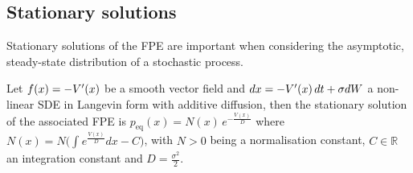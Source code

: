 \documentclass[../main.tex]{subfiles}
\begin{document}
\subsection{Stationary solutions}\label{subsec3.2}
Stationary solutions of the FPE are important when considering the asymptotic, steady-state distribution of a stochastic process.
\begin{theorem}[label=thm3.2.1]{}{}
        Let $f(x)=-V'(x)$ be a smooth vector field and $dx = -V'(x)\,dt + \sigma dW$ a non-linear SDE in Langevin form with additive diffusion, then the stationary solution of the associated FPE is $p_{\text{eq}}(x)=N(x)\,e^{-\frac{V(x)}{D}}$ where $N(x)=N\bigg(\int_{}^{}e^{\frac{V(x)}{D}}dx - C\bigg)$, with $N>0$ being a normalisation constant, $C\in \mathbb{R}$ an integration constant and $D=\frac{\sigma^{2}}{2}$.
\end{theorem}
\end{document}
